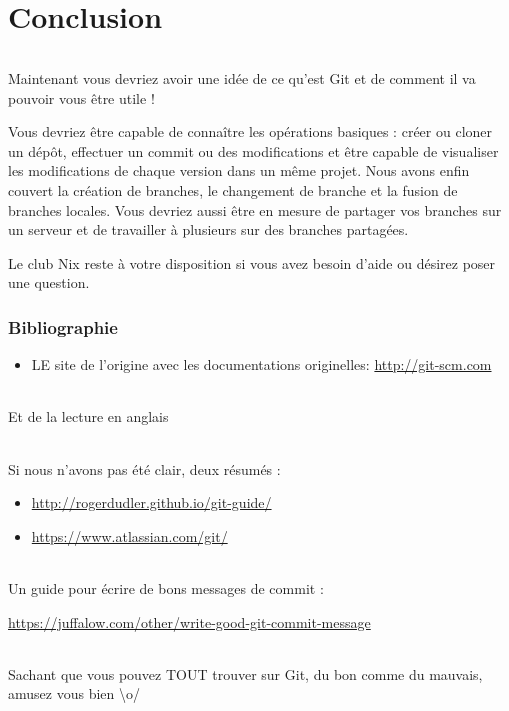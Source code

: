 \documentclass[french, a4paper, 12pt, titlepage]{article}
\begin{document}
\newpage
\part{Conclusion}
\paragraph{}Maintenant vous devriez avoir une idée de ce qu'est Git et de comment il va pouvoir vous être utile !

Vous devriez être capable de connaître les opérations basiques : créer ou cloner un dépôt, effectuer un commit ou des modifications et être capable de visualiser les modifications de chaque version dans un même projet.
Nous avons enfin couvert la création de branches, le changement de branche et la fusion de branches locales.
Vous devriez aussi être en mesure de partager vos branches sur un serveur et de travailler à plusieurs sur des branches partagées.

Le club Nix reste à votre disposition si vous avez besoin d'aide ou désirez poser une question.

\section*{Bibliographie}

\begin{itemize}
	\item LE site de l'origine avec les documentations originelles: \url{http://git-scm.com}
\end{itemize}

\paragraph{}Et de la lecture en anglais
\paragraph{}
Si nous n'avons pas été clair, deux résumés :
\begin{itemize}
	\item \url{http://rogerdudler.github.io/git-guide/}
	\item \url{https://www.atlassian.com/git/}
\end{itemize}


\paragraph{}
Un guide pour écrire de bons messages de commit :

\url{https://juffalow.com/other/write-good-git-commit-message}



\paragraph{}Sachant que vous pouvez TOUT trouver sur Git, du bon comme du mauvais, amusez vous bien \textbackslash o/

\end{document}
